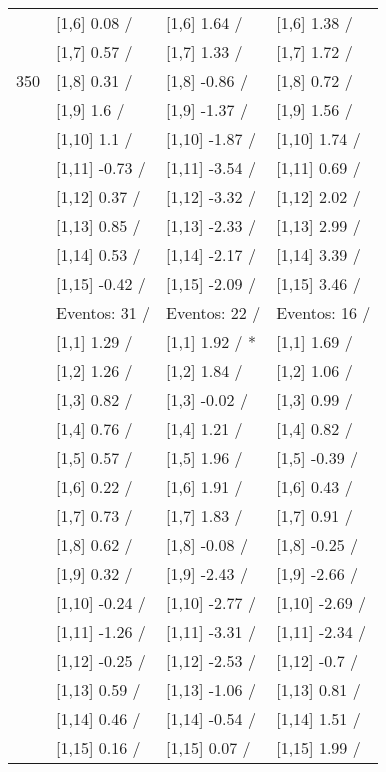 \begin{table}
\begin{tabular}[t]{llll}
 & {}[1,6] 0.08  / & {}[1,6] 1.64  / & {}[1,6] 1.38  /\\
 & {}[1,7] 0.57  / & {}[1,7] 1.33  / & {}[1,7] 1.72  /\\
350 & {}[1,8] 0.31  / & {}[1,8] -0.86  / & {}[1,8] 0.72  /\\
\addlinespace
 & {}[1,9] 1.6  / & {}[1,9] -1.37  / & {}[1,9] 1.56  /\\
 & {}[1,10] 1.1  / & {}[1,10] -1.87  / & {}[1,10] 1.74  /\\
 & {}[1,11] -0.73  / & {}[1,11] -3.54  / & {}[1,11] 0.69  /\\
 & {}[1,12] 0.37  / & {}[1,12] -3.32  / & {}[1,12] 2.02  /\\
 & {}[1,13] 0.85  / & {}[1,13] -2.33  / & {}[1,13] 2.99  /\\
\addlinespace
 & {}[1,14] 0.53  / & {}[1,14] -2.17  / & {}[1,14] 3.39  /\\
 & {}[1,15] -0.42  / & {}[1,15] -2.09  / & {}[1,15] 3.46  /\\
 & Eventos:  31 / & Eventos:  22 / & Eventos:  16 /\\
 & {}[1,1] 1.29  / & {}[1,1] 1.92  / * & {}[1,1] 1.69  /\\
 & {}[1,2] 1.26  / & {}[1,2] 1.84  / & {}[1,2] 1.06  /\\
\addlinespace
 & {}[1,3] 0.82  / & {}[1,3] -0.02  / & {}[1,3] 0.99  /\\
 & {}[1,4] 0.76  / & {}[1,4] 1.21  / & {}[1,4] 0.82  /\\
 & {}[1,5] 0.57  / & {}[1,5] 1.96  / & {}[1,5] -0.39  /\\
 & {}[1,6] 0.22  / & {}[1,6] 1.91  / & {}[1,6] 0.43  /\\
 & {}[1,7] 0.73  / & {}[1,7] 1.83  / & {}[1,7] 0.91  /\\
\addlinespace
500 & {}[1,8] 0.62  / & {}[1,8] -0.08  / & {}[1,8] -0.25  /\\
 & {}[1,9] 0.32  / & {}[1,9] -2.43  / & {}[1,9] -2.66  /\\
 & {}[1,10] -0.24  / & {}[1,10] -2.77  / & {}[1,10] -2.69  /\\
 & {}[1,11] -1.26  / & {}[1,11] -3.31  / & {}[1,11] -2.34  /\\
 & {}[1,12] -0.25  / & {}[1,12] -2.53  / & {}[1,12] -0.7  /\\
\addlinespace
 & {}[1,13] 0.59  / & {}[1,13] -1.06  / & {}[1,13] 0.81  /\\
 & {}[1,14] 0.46  / & {}[1,14] -0.54  / & {}[1,14] 1.51  /\\
 & {}[1,15] 0.16  / & {}[1,15] 0.07  / & {}[1,15] 1.99  /\\
\bottomrule
\end{tabular}
\end{table}
